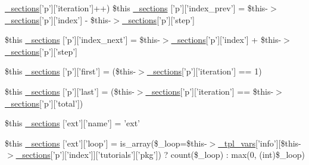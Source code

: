 \begin{DoxyCompactItemize}
\hyperlink{_06_06127_05_06_0612781687_05pkgelementindex_8tpl_8php_a9e3d26b39edfe29c3f29b8035ef33828}{\-\_\-sections}\mbox{[}'p'\mbox{]}\mbox{[}'iteration'\mbox{]}++) \*
\$this \hyperlink{_06_06-72_05_06_06-727729411_05left__frame_8tpl_8php_ae3518934be296cfd855fa76350ecae24}{\-\_\-sections} \mbox{[}'p'\mbox{]}\mbox{[}'index\-\_\-prev'\mbox{]} = \$this-\/$>$\hyperlink{_06_06127_05_06_0612781687_05pkgelementindex_8tpl_8php_a9e3d26b39edfe29c3f29b8035ef33828}{\-\_\-sections}\mbox{[}'p'\mbox{]}\mbox{[}'index'\mbox{]} -\/ \$this-\/$>$\hyperlink{_06_06127_05_06_0612781687_05pkgelementindex_8tpl_8php_a9e3d26b39edfe29c3f29b8035ef33828}{\-\_\-sections}\mbox{[}'p'\mbox{]}\mbox{[}'step'\mbox{]}
\item 
\$this \hyperlink{_06_06-72_05_06_06-727729411_05left__frame_8tpl_8php_a12e484db2ccd39a02dc1d3629356880e}{\-\_\-sections} \mbox{[}'p'\mbox{]}\mbox{[}'index\-\_\-next'\mbox{]} = \$this-\/$>$\hyperlink{_06_06127_05_06_0612781687_05pkgelementindex_8tpl_8php_a9e3d26b39edfe29c3f29b8035ef33828}{\-\_\-sections}\mbox{[}'p'\mbox{]}\mbox{[}'index'\mbox{]} + \$this-\/$>$\hyperlink{_06_06127_05_06_0612781687_05pkgelementindex_8tpl_8php_a9e3d26b39edfe29c3f29b8035ef33828}{\-\_\-sections}\mbox{[}'p'\mbox{]}\mbox{[}'step'\mbox{]}
\item 
\$this \hyperlink{_06_06-72_05_06_06-727729411_05left__frame_8tpl_8php_a078d9529f4dbce53af052f6d965d9b4a}{\-\_\-sections} \mbox{[}'p'\mbox{]}\mbox{[}'first'\mbox{]} = (\$this-\/$>$\hyperlink{_06_06127_05_06_0612781687_05pkgelementindex_8tpl_8php_a9e3d26b39edfe29c3f29b8035ef33828}{\-\_\-sections}\mbox{[}'p'\mbox{]}\mbox{[}'iteration'\mbox{]} == 1)
\item 
\$this \hyperlink{_06_06-72_05_06_06-727729411_05left__frame_8tpl_8php_a9e3d26b39edfe29c3f29b8035ef33828}{\-\_\-sections} \mbox{[}'p'\mbox{]}\mbox{[}'last'\mbox{]} = (\$this-\/$>$\hyperlink{_06_06127_05_06_0612781687_05pkgelementindex_8tpl_8php_a9e3d26b39edfe29c3f29b8035ef33828}{\-\_\-sections}\mbox{[}'p'\mbox{]}\mbox{[}'iteration'\mbox{]} == \$this-\/$>$\hyperlink{_06_06127_05_06_0612781687_05pkgelementindex_8tpl_8php_a9e3d26b39edfe29c3f29b8035ef33828}{\-\_\-sections}\mbox{[}'p'\mbox{]}\mbox{[}'total'\mbox{]})
\item 
\$this \hyperlink{_06_06-72_05_06_06-727729411_05left__frame_8tpl_8php_ac6fb22bcc8e995fd28f8422e166594d4}{\-\_\-sections} \mbox{[}'ext'\mbox{]}\mbox{[}'name'\mbox{]} = 'ext'
\item 
\$this \hyperlink{_06_06-72_05_06_06-727729411_05left__frame_8tpl_8php_a6d5972c92a7f7ccc62d022f6ad5b7d72}{\-\_\-sections} \mbox{[}'ext'\mbox{]}\mbox{[}'loop'\mbox{]} = is\-\_\-array(\$\-\_\-loop=\$this-\/$>$\hyperlink{_06_06127_05_06_0612781687_05pkgelementindex_8tpl_8php_a4a4846d8e68d455590131a05697f67a3}{\-\_\-tpl\-\_\-vars}\mbox{[}'info'\mbox{]}\mbox{[}\$this-\/$>$\hyperlink{_06_06127_05_06_0612781687_05pkgelementindex_8tpl_8php_a9e3d26b39edfe29c3f29b8035ef33828}{\-\_\-sections}\mbox{[}'p'\mbox{]}\mbox{[}'index'\mbox{]}\mbox{]}\mbox{[}'tutorials'\mbox{]}\mbox{[}'pkg'\mbox{]}) ? count(\$\-\_\-loop) \-: max(0, (int)\$\-\_\-loop)

\end{DoxyCompactItemize}

